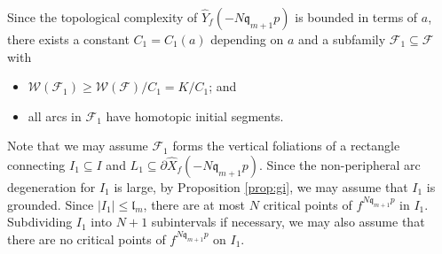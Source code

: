 \documentclass[11pt, reqno]{amsart}
\numberwithin{equation}{section}
\theoremstyle{plain}
\theoremstyle{theorem}
\theoremstyle{plain}
\theoremstyle{definition}
\numberwithin{figure}{section}
\newcommand{\length}{{\mathfrak l}}
\begin{document}
Since the topological complexity of $\widehat Y_f(-N\mathfrak{q}_{m+1}p)$ is bounded in terms of $a$, there exists a constant $C_1 = C_1(a)$ depending on $a$ and a subfamily $\mathcal{F}_1 \subseteq \mathcal{F}$ with
\begin{itemize}
\item $\mathcal{W}(\mathcal{F}_1) \geq \mathcal{W}(\mathcal{F})/C_1 = K/C_1$; and
\item all arcs in $\mathcal{F}_1$ have homotopic initial segments.
\end{itemize}
Note that we may assume $\mathcal{F}_1$ forms the vertical foliations of a rectangle connecting $I_1 \subseteq I$ and $L_1 \subseteq \partial \widehat X_f(-N\mathfrak{q}_{m+1}p)$.
Since the non-peripheral arc degeneration for $I_1$ is large, by Proposition \ref{prop:gi}, we may assume that $I_1$ is grounded.
Since $\vert I_1 \vert \leq \length_m$, there are at most $N$ critical points of $f^{N\mathfrak{q}_{m+1}p}$ in $I_1$. Subdividing $I_1$ into $N+1$ subintervals if necessary, we may also assume that there are no critical points of $f^{N\mathfrak{q}_{m+1}p}$ on $I_1$.
\end{document}
